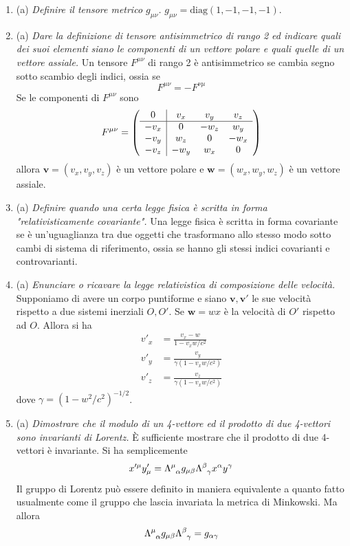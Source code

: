 \documentclass{article}
\renewcommand{\a}{(a)}
\renewcommand{\t}[1]{\textit{ #1}}
\renewcommand{\vec}[1]{\mathbf{#1}}
\begin{document}
\begin{enumerate}
		La traccia di $F$ è
		\[\tensor{F}{^\mu_\mu}=g^{\mu\nu}F_{\nu\mu}\]
		\item\a\t{Definire il tensore metrico $g_{\mu\nu}$.} $g_{\mu\nu}=\mathrm{diag}(1,-1,-1,-1)$.
		\item\a\t{Dare la definizione di tensore antisimmetrico di rango 2 ed indicare quali dei suoi elementi siano le componenti di un vettore polare e quali quelle di un vettore assiale.}
		Un tensore $F^{\mu\nu}$ di rango 2 è antisimmetrico se cambia segno sotto scambio degli indici, ossia se
		\[F^{\mu\nu}=-F^{\nu\mu}\]
		Se le componenti di $F^{\mu\nu}$ sono
		\[F^{\mu\nu}=\left(\begin{array}{c | c c c}
		0&v_x&v_y&v_z\\\hline
		-v_x&0&-w_z&w_y\\-v_y&w_z&0&-w_x\\-v_z&-w_y&w_x&0
		\end{array}\right)\]
		allora $\vec{v}=(v_x,v_y,v_z)$ è un vettore polare e $\vec{w}=(w_x,w_y,w_z)$ è un vettore assiale.
		\item\a\t{Definire quando una certa legge fisica è scritta in forma "relativisticamente covariante".} Una legge fisica è scritta in forma covariante se è un'uguaglianza tra due oggetti che trasformano allo stesso modo sotto cambi di sistema di riferimento, ossia se hanno gli stessi indici covarianti e controvarianti.
		\item\a\t{Enunciare o ricavare la legge relativistica di composizione delle velocità.} Supponiamo di avere un corpo puntiforme e siano $\vec{v},\vec{v}'$ le sue velocità rispetto a due sistemi inerziali $O,O'$. Se $\vec{w}=w\hat{x}$ è la velocità di $O'$ rispetto ad $O$. Allora si ha
		\begin{align*}
			v'_x&=\frac{v_x-w}{1-v_xw/c^2}\\v'_y&=\frac{v_y}{\gamma(1-v_xw/c^2)}\\v'_z&=\frac{v_z}{\gamma(1-v_xw/c^2)}
		\end{align*}
		dove $\gamma=(1-w^2/c^2)^{-1/2}$.
		\item\a\t{Dimostrare che il modulo di un 4-vettore ed il prodotto di due 4-vettori sono invarianti di Lorentz.} \`E sufficiente mostrare che il prodotto di due 4-vettori è invariante. Si ha semplicemente
		\[x'^\mu y'_\mu=\tensor{\Lambda}{^\mu_\alpha}g_{\mu\beta}\tensor{\Lambda}{^\beta_\gamma}x^\alpha y^\gamma\]
		Il gruppo di Lorentz può essere definito in maniera equivalente a quanto fatto usualmente come il gruppo che lascia invariata la metrica di Minkowski. Ma allora
		\[\tensor{\Lambda}{^\mu_\alpha}g_{\mu\beta}\tensor{\Lambda}{^\beta_\gamma}=g_{\alpha\gamma}\]

\end{enumerate}
\end{document}
